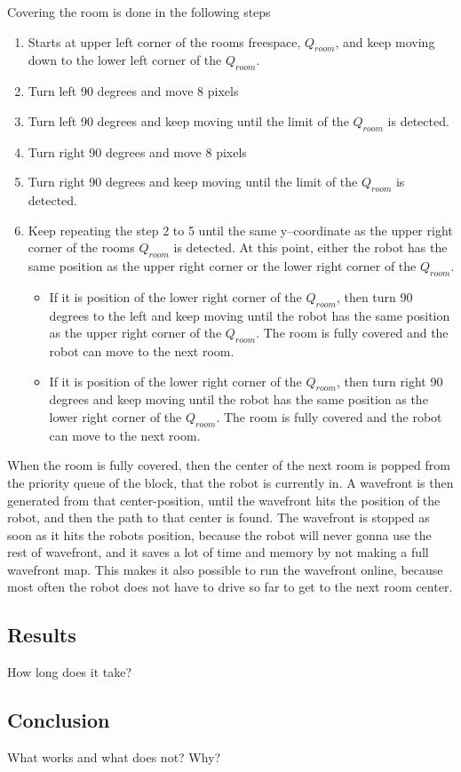 Covering the room is done in the following steps
\begin{enumerate}\itemsep-2pt
\item Starts at upper left corner of the rooms freespace, $Q_{room}$, and keep moving down to the lower left corner of the $Q_{room}$.
\item Turn left 90 degrees and move 8 pixels
\item Turn left 90 degrees and keep moving until the limit of the $Q_{room}$ is detected.
\item Turn right 90 degrees and move 8 pixels
\item Turn right 90 degrees and keep moving until the limit of the $Q_{room}$ is detected.
\item Keep repeating the step 2 to 5 until the same y--coordinate as the upper right corner of the rooms $Q_{room}$ is detected. At this point, either the robot has the same position as the upper right corner or the lower right corner of the $Q_{room}$.    
\begin{itemize}\itemsep-2pt  
\item If it is position of the lower right corner of the $Q_{room}$, then turn 90 degrees to the left and keep moving until the robot has the same position as the upper right corner of the $Q_{room}$. The room is fully covered and the robot can move to the next room.
\item If it is position of the lower right corner of the $Q_{room}$, then turn right 90 degrees and keep moving until the robot has the same position as the lower right corner of the $Q_{room}$. The room is fully covered and the robot can move to the next room. 
\end{itemize}
\end{enumerate} 
When the room is fully covered, then the center of the next room is popped from the priority queue of the block, that the robot is currently in. A wavefront is then generated from that center-position, until the wavefront hits the position of the robot, and then the path to that center is found. The wavefront is stopped as soon as it hits the robots position, because the robot will never gonna use the rest of wavefront, and it saves a lot of time and memory by not making a full wavefront map. This makes it also possible to run the wavefront online, because most often the robot does not have to drive so far to get to the next room center. 

\subsection{Results}
How long does it take?

\subsection{Conclusion}
What works and what does not? Why?
